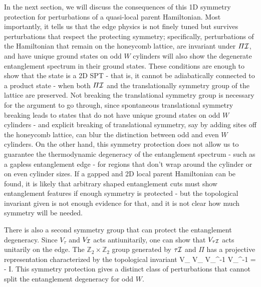In the next section, we will discuss the consequences of this 1D symmetry protection 
for perturbations of a quasi-local parent Hamiltonian. Most importantly, it tells us
that the edge physics is not finely tuned but survives perturbations that respect the
protecting symmetry; specifically, perturbations of the Hamiltonian that 
remain on the honeycomb lattice,
are invariant under $\varPi \mathcal{I}$,
and have unique ground states on odd $W$ cylinders
will also show the degenerate entanglement spectrum in their ground states.
These conditions are enough to show that the state is a 2D SPT - that is, 
it cannot be adiabatically connected to a product state - when both $\varPi \mathcal{I}$ and
the translationally symmetry group of the lattice are preserved. Not breaking the
translational symmetry group is necessary for the argument to go through, since spontaneous
translational symmetry breaking leads to states that do not have unique ground states
on odd $W$ cylinders - and explicit breaking of translational symmetry, say by adding sites
off the honeycomb lattice, can blur the distinction between odd and even $W$ cylinders.
On the other hand, this symmetry protection does not allow us to guarantee the thermodynamic
degeneracy of the entanglement spectrum - such as a gapless entanglement edge - for regions
that don't wrap around the cylinder or on even cylinder sizes. If a gapped and 2D local 
parent Hamiltonian can be found, it is likely that arbitrary shaped entanglement cuts
must show entanglement features if enough symmetry is protected - but the topological invariant 
given is not enough evidence for that, and it is not clear how much symmetry will be needed.


There is also a second symmetry group that can protect the entanglement degeneracy.
Since $V_{\tau}$ and $V_{\mathcal{I}}$ acts antiunitarily, one can show that $V_{\tau \mathcal{I}}$ acts
unitarily on the edge. The $\mathbb{Z}_2 \times \mathbb{Z}_2$ group generated by
$\tau \mathcal{I}$ and $\varPi$ has a projective representation characterized by the 
topological invariant
\beq
V_{\varPi} V_{\tau \I} V_{\varPi}^{-1} V_{\tau \I}^{-1}
 = - I.
\eeq
This symmetry protection gives a distinct class of perturbations that cannot
split the entanglement degeneracy for odd $W$.

